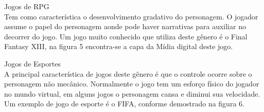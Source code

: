 \begin{alineascomponto}
\item Jogos de RPG\\
Tem como característica o desenvolvimento gradativo do personagem. O jogador assume o papel do personagem aonde pode haver narrativas para auxiliar no decorrer do jogo.
Um jogo muito conhecido que utiliza deste gênero é o Final Fantasy XIII,  na figura 5 encontra-se a capa da Mídia digital deste jogo. \cite{gen1}
\end{alineascomponto}
\pagebreak
\begin{figure}[h!]
		\centering
	\end{figure}
	
\begin{alineascomponto}
\item Jogos de Esportes\\
A principal característica de jogos deste gênero é que o controle ocorre sobre o personagem não mecânico. Normalmente o jogo tem um esforço físico do jogador no mundo virtual, em alguns jogos o personagem cansa e diminui sua velocidade. Um exemplo de jogo de esporte é o FIFA, conforme demostrado na figura 6. \cite{gen1}

\end{alineascomponto}
\begin{figure}[h!]
		\centering
	\end{figure}

